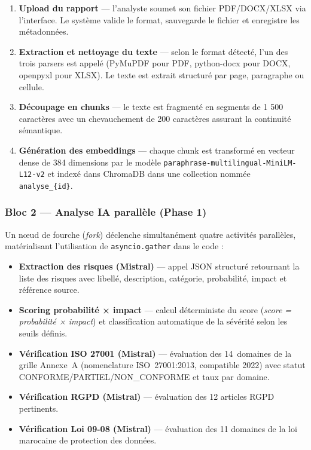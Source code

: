 \documentclass[a4paper,12pt,oneside]{report}
\begin{document}
	\begin{enumerate}
		\item \textbf{Upload du rapport} — l'analyste soumet son fichier
		PDF/DOCX/XLSX via l'interface. Le système valide le format,
		sauvegarde le fichier et enregistre les métadonnées.
		\item \textbf{Extraction et nettoyage du texte} — selon le format
		détecté, l'un des trois parsers est appelé (PyMuPDF pour PDF,
		python-docx pour DOCX, openpyxl pour XLSX). Le texte est extrait
		structuré par page, paragraphe ou cellule.
		\item \textbf{Découpage en chunks} — le texte est fragmenté en segments
		de 1 500 caractères avec un chevauchement de 200 caractères assurant
		la continuité sémantique.
		\item \textbf{Génération des embeddings} — chaque chunk est transformé
		en vecteur dense de 384 dimensions par le modèle
		\texttt{paraphrase-multilingual-MiniLM-L12-v2} et indexé dans
		ChromaDB dans une collection nommée
		\texttt{analyse\_\{id\}}.
	\end{enumerate}
	
	\subsubsection*{Bloc 2 — Analyse IA parallèle (Phase 1)}
	
	Un nœud de fourche (\textit{fork}) déclenche simultanément quatre
	activités parallèles, matérialisant l'utilisation de
	\texttt{asyncio.gather} dans le code :
	
	\begin{itemize}
		\item \textbf{Extraction des risques (Mistral)} — appel JSON structuré
		retournant la liste des risques avec libellé, description, catégorie,
		probabilité, impact et référence source.
		\item \textbf{Scoring probabilité × impact} — calcul déterministe du
		score (\textit{score = probabilité × impact}) et classification
		automatique de la sévérité selon les seuils définis.
		\item \textbf{Vérification ISO 27001 (Mistral)} — évaluation des
		14~domaines de la grille Annexe~A (nomenclature ISO~27001:2013, compatible 2022) avec statut CONFORME/PARTIEL/NON\_CONFORME
		et taux par domaine.
		\item \textbf{Vérification RGPD (Mistral)} — évaluation des 12 articles
		RGPD pertinents.
		\item \textbf{Vérification Loi 09-08 (Mistral)} — évaluation des
		11 domaines de la loi marocaine de protection des données.
	\end{itemize}
	
\end{document}
